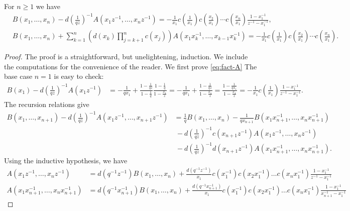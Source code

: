\documentclass[10pt,a4paper]{amsart}
\begin{document}
\begin{lemma}\label{l:fact-AB}
For $n\geq 1$ we have
\begin{align} \label{eq:fact-A}
&B(x_1,\ldots,x_n)-d
\left(\frac{1}{qz}\right)^{-1}A(x_1z^{-1},\ldots,
x_nz^{-1})=-\frac{1}{x_1}c \left(\frac{1}{x_1}\right)c
\left(\frac{x_2}{x_1}\right)\cdots c
\left(\frac{x_n}{x_1}\right)\frac{1-x_1^{-1}}{z^{-1}-x_1^{-1}}, \\ \label{eq:fact-B}
&B(x_1,\ldots, x_n)+\sum_{k=1}^{n}\left(d(x_k)\prod_{j=k+1}^nc(x_j)\right)A(x_1x_k^{-1},\ldots, x_{k-1}x_k^{-1}) =-\frac{1}{x_1}c \left(\frac{1}{x_1}\right)c
\left(\frac{x_2}{x_1}\right)\cdots c
\left(\frac{x_n}{x_1}\right).
\end{align}
\end{lemma}

\begin{proof}
The proof is a straightforward, but unelightening, induction. We
include the computations for the convenience of the reader. We first prove  \eqref{eq:fact-A} The base case $n=1$ is easy to check:
\begin{align*}
B(x_1)-d
  \left(\frac{1}{qz}\right)^{-1}A(x_1z^{-1})&=-\frac{1}{qx_1}+\frac{1-\frac{1}{qz}}{1-\frac{1}{q}}\frac{1-\frac{1}{q}}{1-\frac{x_1}{z}}=-\frac{1}{qx_1}+\frac{1-\frac{1}{qz}}{1-\frac{x_1}{z}}=\frac{1-\frac{1}{qx_1}}{1-\frac{x_1}{z}}=-\frac{1}{x_1}c \left(\frac{1}{x_1}\right)\frac{1-x_1^{-1}}{z^{-1}-x_1^{-1}}.
\end{align*}
The recursion relations give
\begin{align*}
B(x_1,\ldots,x_{n+1})-d
\left(\frac{1}{qz}\right)^{-1}A(x_1z^{-1},\ldots,
x_{n+1}z^{-1})&=\frac{1}{q}B(x_1,\ldots,x_{n})-\frac{1}{qx_{n+1}}B(x_1x_{n+1}^{-1},\ldots,
                x_nx_{n+1}^{-1})\\
  &\ -d
    \left(\frac{1}{qz}\right)^{-1}c(x_{n+1}z^{-1})A(x_1z^{-1},\ldots,x_nz^{-1})\\
  &\ -d
\left(\frac{1}{qz}\right)^{-1}d(x_{n+1}z^{-1})A(x_1x_{n+1}^{-1},\ldots,
                x_nx_{n+1}^{-1}).
\end{align*}
Using the inductive hypothesis, we have
\begin{align*}
A(x_1z^{-1},\ldots,x_nz^{-1})&=d(q^{-1}z^{-1})B(x_1,\ldots,x_n)+\frac{d(q^{-1}z^{-1})}{x_1}c(x_1^{-1})c(x_2x_1^{-1})\ldots c(x_nx_1^{-1})\frac{1-x_1^{-1}}{z^{-1}-x_1^{-1}}\\
A(x_1x_{n+1}^{-1},\ldots,x_nx_{n+1}^{-1})&=d(q^{-1}x_{n+1}^{-1})B(x_1,\ldots,x_n)+\frac{d(q^{-1}x_{n+1}^{-1})}{x_1}c(x_1^{-1})c(x_2x_1^{-1})\ldots c(x_nx_1^{-1})\frac{1-x_1^{-1}}{x_{n+1}^{-1}-x_1^{-1}}

\end{align*}
\end{proof}
\end{document}
